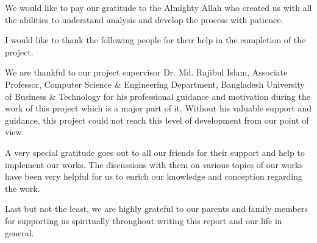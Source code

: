 
We would like to pay our gratitude to the Almighty Allah who created us with all the abilities to understand analysis and develop the process with patience.

I would like to thank the following people for their help in the completion of the project.

We are thankful to our project supervisor Dr. Md. Rajibul Islam, Associate Professor, Computer Science \& Engineering Department, Bangladesh University of Business \& Technology for his professional guidance and motivation during the work of this project which is a major part of it. Without his valuable support and guidance, this project could not reach this level of development from our point of view.

A very special gratitude goes out to all our friends for their support and help to implement our works. The discussions with them on various topics of our works have been very helpful for us to enrich our knowledge and conception regarding the work.

Last but not the least, we are highly grateful to our parents and family members for supporting us spiritually throughout writing this report and our life in general.

\endinput

